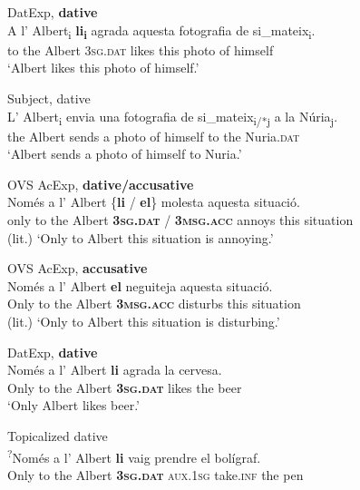\documentclass[output=paper,colorlinks,citecolor=brown,modfonts,nonflat]{langsci/langscibook}
\begin{document}
 \ex DatExp, \textbf{dative}\label{ex:royo:8b}\\
 \gll A l’ Albert\textsubscript{i} \textbf{li\textsubscript{i}} agrada aquesta fotografia de si\_mateix\textsubscript{i}.\\
 to the Albert {\textsc{3sg.dat}} likes this photo of himself\\
\glt ‘Albert likes this photo of himself.’

 
  \ex Subject, dative\label{ex:royo:8d}\\
 \gll L’ Albert\textsubscript{i} envia una fotografia de si\_mateix\textsubscript{i/*j} a la Núria\textsubscript{j}.\\
 the Albert sends a photo of himself to the Nuria.\textsc{dat}\\
\glt ‘Albert sends a photo of himself to Nuria.’
 
 \z
 \z

\ea%
 \label{ex:royo:9}
 \ea OVS AcExp, \textbf{dative/accusative} \label{ex:royo:9a}\\
 \gll Només a l’ Albert \{\textbf{li} / \textbf{el}\} molesta aquesta situació. \\
 only to the Albert \textbf{\textsc{3sg.dat}} / \textbf{\textsc{3msg.acc}} annoys this situation \\
\glt (lit.) ‘Only to Albert this situation is annoying.’
 
 \ex OVS AcExp, \textbf{accusative} \label{ex:royo:9b}\\
 \gll Només a l’ Albert \textbf{el} neguiteja aquesta situació.\\
 Only to the Albert \textbf{\textsc{3msg.acc}} disturbs this situation\\
 \glt (lit.) ‘Only to Albert this situation is disturbing.’
 
  \ex DatExp, \textbf{dative} \label{ex:royo:9c}\\
 \gll   Només a l’ Albert \textbf{li} agrada la cervesa. \\
 Only to the Albert \textbf{\textsc{3sg.dat}} likes the beer\\
\glt ‘Only Albert likes beer.’
 
 \ex Topicalized dative \label{ex:royo:9d}\\
\gll \textsuperscript{?}Només a l’ Albert \textbf{li} vaig prendre el bolígraf.\footnotemark{}\\
 Only to the Albert \textbf{\textsc{3sg.dat}} \textsc{aux.1sg} take.\textsc{inf} the pen\\
\glt 
 \z
 \z
 
\end{document}
